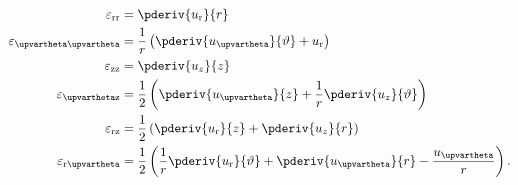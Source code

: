 \begin{equation}
\label{Eq2:strainsInPolar}
\begin{split}
	\varepsilon_{\mathrm{rr}} &= \pderiv{u_{\mathrm{r}}}{r}\\
	\varepsilon_{\upvartheta\upvartheta} &= \frac{1}{r}\left(\pderiv{u_{\upvartheta}}{\vartheta} + u_{\mathrm{r}}\right)\\
	\varepsilon_{\mathrm{zz}} &= \pderiv{u_z}{z}\\
	\varepsilon_{\upvartheta\mathrm{z}} &= \frac{1}{2}\left(\pderiv{u_{\upvartheta}}{z} + \frac{1}{r}\pderiv{u_z}{\vartheta}\right)\\
	\varepsilon_{\mathrm{rz}} &= \frac{1}{2}\left(\pderiv{u_{\mathrm{r}}}{z} + \pderiv{u_z}{r}\right)\\
	\varepsilon_{\mathrm{r}\upvartheta} &= \frac{1}{2}\left(\frac{1}{r}\pderiv{u_{\mathrm{r}}}{\vartheta} + \pderiv{u_{\upvartheta}}{r} - \frac{u_{\upvartheta}}{r}\right).
\end{split}
\end{equation}


